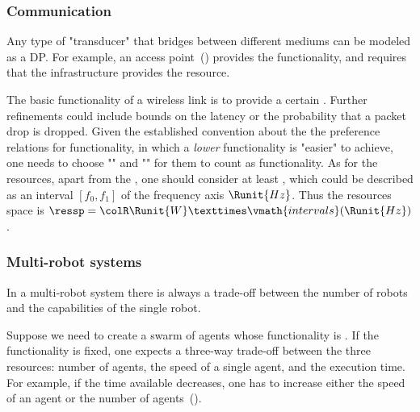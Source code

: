 

\subsubsection{Communication}

\begin{example}[Transducers]
Any type of "transducer" that bridges between different
mediums can be modeled as a DP. For example, an access point~()
provides the  functionality, and requires
that the infrastructure provides the  resource.
\end{example}


\begin{figure}[h] 
    \centering
    \caption{\label{fig:accesspoint}}
\end{figure}

\begin{example}
The basic functionality of a wireless link is to provide
a certain . Further refinements could include bounds
on the latency or the probability that a packet drop is dropped. Given
the established convention about the the preference relations for
functionality, in which a \emph{lower} functionality is "easier"
to achieve, one needs to choose ""
and "" for them
to count as functionality. As for the resources, apart from the , one should consider at least ,
which could be described as an interval $[f_0,f_1]$ of the frequency
axis $\Runit{Hz}$. Thus the resources space is $\ressp=\colR\Runit{W}×\vmath{intervals}(\Runit{Hz})$.
\end{example}

\begin{figure}[h]
\begin{center}
\end{center}
\caption{ \label{fig:networklink}}
\end{figure}


\subsubsection{Multi-robot systems}

In a multi-robot system there is always a trade-off between the number
of robots and the capabilities of the single robot.
\begin{example}
Suppose we need to create a swarm of agents whose functionality is
. If the functionality is fixed, one expects
a three-way trade-off between the three resources: number of agents,
the speed of a single agent, and the execution time. For example,
if the time available decreases, one has to increase either the speed
of an agent or the number of agents~().
\end{example}

